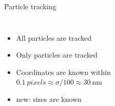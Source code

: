 \begin{frame}{Particle tracking}
\begin{columns}
	\begin{itemize}
		\item All particles are tracked
		\item Only particles are tracked
		\item Coordinates are known within\\
			$\SI{0.1}{pixels} \approx \sigma/100 \approx \SI{30}{\nano\metre}$
		\item \alert{new}: sizes are known
	\end{itemize}
	\end{columns}
\end{frame}

